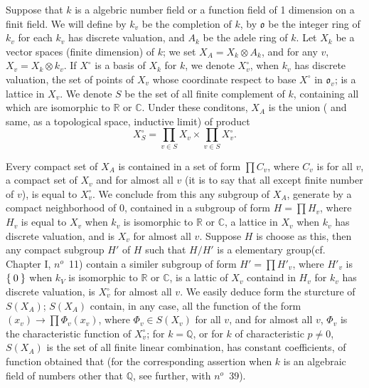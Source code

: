 \documentclass[12pt]{amsart}
\def\bR{{\mathbb{R}}}
\def\bC{{\mathbb{C}}}
\def\bQ{{\mathbb{Q}}}
\newcounter{ssection}
\renewcommand{\subsection}{
  \addtocounter{ssection}{1}{\bf  \arabic{ssection}.\  }}
\begin{document}
\def\fo{\mathfrak{o}}
\setcounter{ssection}{28}
\subsection{}
Suppose that $k$ is a algebric number field or a function field of 1 dimension 
on a finit field. We will define by $k_v$ be the completion of $k$,
 by $\fo$ be the integer ring of $k_v$ for each $k_v$ has discrete valuation,
and $A_k$ be the adele ring of $k$. Let $X_k$ be a vector spaces 
(finite dimension) of $k$; we set $X_A= X_k\otimes A_k$, and for any $v$, 
$X_v=X_k\otimes k_v$. If $X^\circ$ is a basis of $X_k$ for $k$, we denote
$X_v^\circ$, when $k_v$ has discrete valuation, the set of points of $X_v$
whose coordinate respect to base $X^\circ$ in $\fo_v$;
is a lattice in $X_v$. We denote $S$ be the set of all 
 finite complement of $k$, containing all which are isomorphic 
to $\bR$ or $\bC$. Under these conditons, $X_A$ is the union ( and same, 
as a topological space, inductive limit) of product
\begin{equation}\label{eq:29}
X_S^\circ = \prod_{v\in S} X_v \times \prod_{v\in S} X_v^\circ.
\end{equation}

Every compact set of $X_A$ is contained in a set of form $\prod C_v$, 
where $C_v$ is for all $v$, a compact set of $X_v$ and for almost all $v$
(it is to say that all except finite number of $v$), is equal to $X_v^\circ$.
We conclude from this any subgroup of $X_A$, 
generate by a compact neighborhood of $0$, contained in a subgroup of form
$H=\prod H_v$, where $H_v$ is equal to $X_v$ when $k_v$ is isomorphic to $\bR$
or $\bC$, a lattice in $X_v$ when $k_v$ has discrete valuation, and is $X_v$
for almost all $v$. Suppose $H$ is choose as this, then any compact subgroup 
$H'$ of $H$ such that $H/H'$ is a elementary group(cf. Chapter I, $n^o$~11)
contain a similer subgroup of form $H'=\prod H'_v$,  where $H'_v$ is 
$\Set{0}$ when $k_V$ is isomorphic to $\bR$ or $\bC$, is a lattic of
$X_v$ containd in $H_v$ for $k_v$ has discrete valuation, is $X_v^\circ$
for almost all $v$. We easily deduce form the sturcture of $S(X_A)$;
$S(X_A)$ contain, in any case, all the function of the 
form $(x_v) \to \prod \Phi_v(x_v)$, where $\Phi_v \in S(X_v)$ for all 
$v$, and for almost all $v$, $\Phi_v$ is the characteristic function 
of $X_v^\circ$; for $k=\bQ$, or for $k$ of characteristic $p\neq 0$, 
$S(X_A)$ is the set of all finite linear combination, has constant coefficients,
of function obtained that (for the corresponding assertion when 
$k$ is an algebraic field of numbers other that $\bQ$, 
see further, with $n^o$~39).
\end{document}
